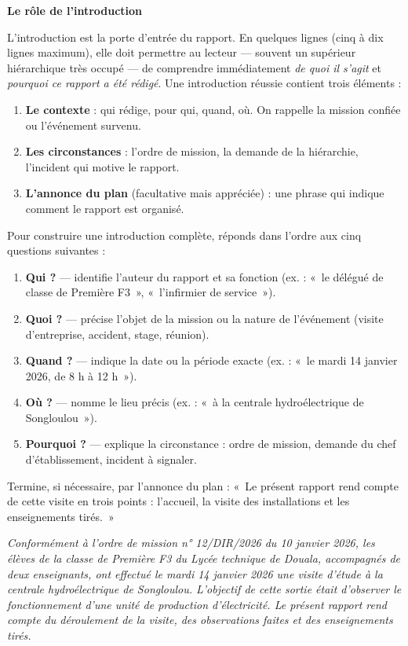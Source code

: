 \documentclass[11pt]{article}
\newcounter{popsec}
\newcounter{popsub}
\newcommand{\courssub}[1]{%
  \stepcounter{popsub}%
  \par\vspace{9pt}\noindent{\popxbold\fontsize{11.5}{13}\selectfont\color{popink}{\color{poporange}\thepopsec.\thepopsub}\hspace{6pt}#1}\par\nopagebreak\vspace{4pt}
}
\begin{document}
\courssub{L'introduction du rapport}

\textbf{Le rôle de l'introduction}\par
L'introduction est la porte d'entrée du rapport. En quelques lignes (cinq à dix lignes maximum), elle doit permettre au lecteur — souvent un supérieur hiérarchique très occupé — de comprendre immédiatement \emph{de quoi il s'agit} et \emph{pourquoi ce rapport a été rédigé}. Une introduction réussie contient trois éléments :

\begin{enumerate}
\item \textbf{Le contexte} : qui rédige, pour qui, quand, où. On rappelle la mission confiée ou l'événement survenu.
\item \textbf{Les circonstances} : l'ordre de mission, la demande de la hiérarchie, l'incident qui motive le rapport.
\item \textbf{L'annonce du plan} (facultative mais appréciée) : une phrase qui indique comment le rapport est organisé.
\end{enumerate}

\begin{methode}
Pour construire une introduction complète, réponds dans l'ordre aux cinq questions suivantes :
\begin{enumerate}
\item \textbf{Qui ?} — identifie l'auteur du rapport et sa fonction (ex. : «~le délégué de classe de Première F3~», «~l'infirmier de service~»).
\item \textbf{Quoi ?} — précise l'objet de la mission ou la nature de l'événement (visite d'entreprise, accident, stage, réunion).
\item \textbf{Quand ?} — indique la date ou la période exacte (ex. : «~le mardi 14 janvier 2026, de 8 h à 12 h~»).
\item \textbf{Où ?} — nomme le lieu précis (ex. : «~à la centrale hydroélectrique de Songloulou~»).
\item \textbf{Pourquoi ?} — explique la circonstance : ordre de mission, demande du chef d'établissement, incident à signaler.
\end{enumerate}
Termine, si nécessaire, par l'annonce du plan : «~Le présent rapport rend compte de cette visite en trois points : l'accueil, la visite des installations et les enseignements tirés.~»
\end{methode}

\begin{exemplebox}
\emph{Conformément à l'ordre de mission n° 12/DIR/2026 du 10 janvier 2026, les élèves de la classe de Première F3 du Lycée technique de Douala, accompagnés de deux enseignants, ont effectué le mardi 14 janvier 2026 une visite d'étude à la centrale hydroélectrique de Songloulou. L'objectif de cette sortie était d'observer le fonctionnement d'une unité de production d'électricité. Le présent rapport rend compte du déroulement de la visite, des observations faites et des enseignements tirés.}
\end{exemplebox}
\end{document}

